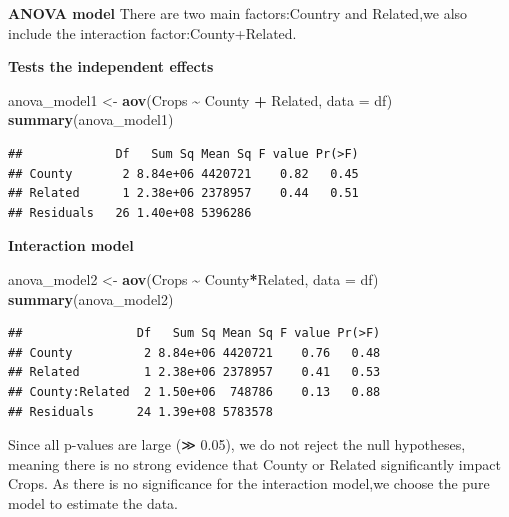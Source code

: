 \documentclass[
]{article}
\newenvironment{Shaded}{\begin{snugshade}}{\end{snugshade}}
\newcommand{\AttributeTok}[1]{\textcolor[rgb]{0.13,0.29,0.53}{#1}}
\newcommand{\FunctionTok}[1]{\textcolor[rgb]{0.13,0.29,0.53}{\textbf{#1}}}
\newcommand{\NormalTok}[1]{#1}
\newcommand{\OtherTok}[1]{\textcolor[rgb]{0.56,0.35,0.01}{#1}}
\newcommand{\SpecialCharTok}[1]{\textcolor[rgb]{0.81,0.36,0.00}{\textbf{#1}}}
\begin{document}
\textbf{ANOVA model} There are two main factors:Country and Related,we
also include the interaction factor:County+Related.

\textbf{Tests the independent effects}

\begin{Shaded}
\begin{Highlighting}[]
\NormalTok{anova\_model1 }\OtherTok{\textless{}{-}} \FunctionTok{aov}\NormalTok{(Crops }\SpecialCharTok{\textasciitilde{}}\NormalTok{ County }\SpecialCharTok{+}\NormalTok{ Related, }\AttributeTok{data =}\NormalTok{ df) }
\FunctionTok{summary}\NormalTok{(anova\_model1)}
\end{Highlighting}
\end{Shaded}

\begin{verbatim}
##             Df   Sum Sq Mean Sq F value Pr(>F)
## County       2 8.84e+06 4420721    0.82   0.45
## Related      1 2.38e+06 2378957    0.44   0.51
## Residuals   26 1.40e+08 5396286
\end{verbatim}

\textbf{Interaction model}

\begin{Shaded}
\begin{Highlighting}[]
\NormalTok{anova\_model2 }\OtherTok{\textless{}{-}} \FunctionTok{aov}\NormalTok{(Crops }\SpecialCharTok{\textasciitilde{}}\NormalTok{ County}\SpecialCharTok{*}\NormalTok{Related, }\AttributeTok{data =}\NormalTok{ df) }
\FunctionTok{summary}\NormalTok{(anova\_model2)}
\end{Highlighting}
\end{Shaded}

\begin{verbatim}
##                Df   Sum Sq Mean Sq F value Pr(>F)
## County          2 8.84e+06 4420721    0.76   0.48
## Related         1 2.38e+06 2378957    0.41   0.53
## County:Related  2 1.50e+06  748786    0.13   0.88
## Residuals      24 1.39e+08 5783578
\end{verbatim}

Since all p-values are large (≫ 0.05), we do not reject the null
hypotheses, meaning there is no strong evidence that County or Related
significantly impact Crops. As there is no significance for the
interaction model,we choose the pure model to estimate the data.
\end{document}
